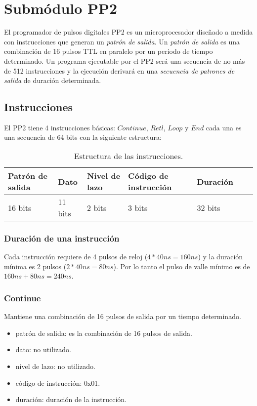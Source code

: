 \section{Subm\'odulo PP2}

El programador de pulsos digitales PP2 es un microprocesador dise\~nado a medida con instrucciones que generan
un \textit{patr\'on de salida}.
Un \textit{patr\'on de salida} es una combinaci\'on de 16 pulsos TTL en paralelo por un periodo 
de tiempo determinado.
Un programa ejecutable por el PP2 ser\'a una secuencia de no m\'as de 512 instrucciones 
y la ejecuci\'on derivar\'a en una \textit{secuencia de patrones de salida} de duraci\'on determinada.


\subsection{Instrucciones}

El PP2 tiene 4 instrucciones b\'asicas: $Continue$, $Retl$, $Loop$ y $End$ 
cada una es una secuencia de 64 bits con la siguiente estructura:\\
\begin{table}[ht]
    \centering
    \begin{tabular}{|l|l|l|l|l|l|l|}
    \hline
    Patr\'on de salida  & Dato & Nivel de lazo & C\'odigo de instrucci\'on & Duraci\'on \\
    \hline
    16 bits & 11 bits & 2 bits & 3 bits & 32 bits\\
    \hline
\end{tabular}
\caption{\label{tab:pp2_ins}Estructura de las instrucciones.}
\end{table}


\subsubsection{Duraci\'on de una instrucci\'on}
Cada instrucci\'on requiere de 4 pulsos de reloj ($4 * 40ns = 160ns$) 
y la duraci\'on m\'inima es 2 pulsos ($2 * 40ns = 80ns$). Por lo tanto el pulso de
valle m\'inimo es de $160ns + 80ns = 240ns$.

\subsubsection{Continue}
Mantiene una combinaci\'on de 16 pulsos de salida por un tiempo determinado.
\begin{itemize}
    \item patr\'on de salida: es la combinaci\'on de 16 pulsos de salida.
    \item dato: no utilizado.
    \item nivel de lazo: no utilizado.
    \item c\'odigo de instrucci\'on: 0x01.
    \item duraci\'on: duraci\'on de la instrucci\'on.
\end{itemize}

